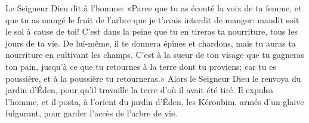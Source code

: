 Le Seigneur Dieu dit à l’homme: «Parce que tu as écouté la voix de ta femme,
	et que tu as mangé le fruit de l’arbre que je t’avais interdit de manger:
	maudit soit le sol à cause de toi!
	C’est dans la peine que tu en tireras ta nourriture,
	tous les jours de ta vie.
De lui-même, il te donnera épines et chardons,
	mais tu auras ta nourriture en cultivant les champs.
C’est à la sueur de ton visage que tu gagneras ton pain,
	jusqu’à ce que tu retournes à la terre dont tu proviens;
	car tu es poussière, et à la poussière tu retourneras.»
Alors le Seigneur Dieu le renvoya du jardin d’Éden,
	pour qu’il travaille la terre d’où il avait été tiré.
Il expulsa l’homme,
	et il posta, à l’orient du jardin d’Éden, les Kéroubim,
		armés d’un glaive fulgurant,
	pour garder l’accès de l’arbre de vie.
